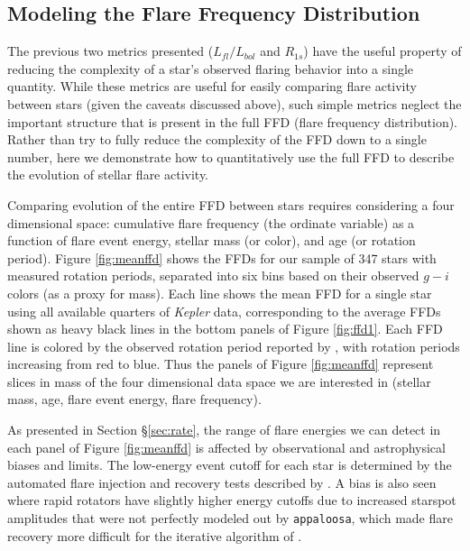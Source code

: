 \documentclass[preprint2]{aastex62}
\newcommand{\Kepler}{\textsl{Kepler}\xspace}
\begin{document}
\subsection{Modeling the Flare Frequency Distribution}
\label{sec:ffd}

The previous two metrics presented ($L_{fl}/L_{bol}$ and $R_{1s}$) have the useful property of reducing the complexity of a star's observed flaring behavior into a single quantity. While these metrics are useful for easily comparing flare activity between stars (given the caveats discussed above), such simple metrics neglect the important structure that is present in the full FFD (flare frequency distribution). Rather than try to fully reduce the complexity of the FFD down to a single number, here we demonstrate how to quantitatively use the full FFD to describe the evolution of stellar flare activity.


Comparing evolution of the entire FFD between stars requires considering a four dimensional space: cumulative flare frequency (the ordinate variable) as a function of flare event energy, stellar mass (or color), and age (or rotation period). 
Figure \ref{fig:meanffd} shows the FFDs for our sample of 347 stars with measured rotation periods, separated into six bins based on their observed $g-i$ colors (as a proxy for mass).
Each line shows the mean FFD for a single star using all available quarters of \Kepler data, corresponding to the average FFDs shown as heavy black lines in the bottom panels of Figure \ref{fig:ffd1}.
Each FFD line is colored by the observed rotation period reported by \citet{mcquillan2014}, with  rotation periods increasing from red to blue. Thus the panels of Figure \ref{fig:meanffd} represent slices in mass of the four dimensional data space we are interested in (stellar mass, age, flare event energy, flare frequency). 

As presented in Section \S\ref{sec:rate}, the range of flare energies we can detect in each panel of Figure \ref{fig:meanffd} is affected by observational and astrophysical biases and limits.
The low-energy event cutoff for each star is determined by the automated flare injection and recovery tests described by \citet{davenport2016}. A bias is also seen where rapid rotators have slightly higher energy cutoffs due to increased starspot amplitudes that were not perfectly modeled out by {\tt appaloosa}, which made flare recovery more difficult for the iterative algorithm of \citet{davenport2016}.
\end{document}
